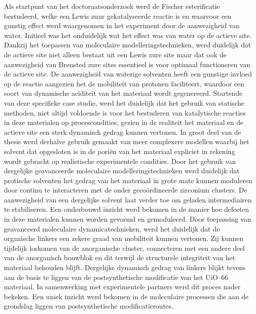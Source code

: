 \npar
Als startpunt van het doctoraatsonderzoek werd de Fischer esterificatie bestudeerd, welke een Lewis zuur gekatalyseerde reactie is en waarvoor een gunstig effect werd waargenomen in het experiment door de aanwezigheid van water. Initieel was het onduidelijk wat het effect was van water op de actieve site. Dankzij het toepassen van moleculaire modelleringstechnieken, werd duidelijk dat de actieve site niet alleen bestaat uit een Lewis zure site maar dat ook de aanwezigheid van Brønsted zure sites essentieel is voor optimaal functioneren van de actieve site. De aanwezigheid van waterige solventen heeft een gunstige invloed op de reactie aangezien het de mobiliteit van protonen faciliteert, waardoor een soort van dynamische aciditeit van het materiaal wordt gegenereerd. 
\npar
Startende van deze specifieke case studie, werd het duidelijk dat het gebruik van statische methoden, niet altijd voldoende is voor het bestuderen van katalytische reacties in deze materialen op procescondities, gezien in de realiteit het materiaal en de actieve site een sterk dynamisch gedrag kunnen vertonen. In groot deel van de thesis werd derhalve gebruik gemaakt van meer complexere modellen waarbij het solvent dat opgesloten is in de poriën van het materiaal expliciet in rekening wordt gebracht op realistische experimentele condities. Door het gebruik van dergelijke geavanceerde moleculaire modelleringstechnieken werd duidelijk dat protische solventen het gedrag van het materiaal in grote mate kunnen moduleren door continu te interacteren met de onder gecoördineerde zirconium clusters. De aanwezigheid van een dergelijke solvent laat verder toe om geladen intermediairen te stabiliseren. Een onderbouwd inzicht werd bekomen in de manier hoe defecten in deze materialen kunnen worden gevormd en gemoduleerd. Door toepassing van geavanceerd moleculaire dynamicatechnieken, werd het duidelijk dat de organische linkers een zekere graad van mobiliteit kunnen vertonen. Zij kunnen tijdelijk loskomen van de anorganische cluster, connecteren met een andere deel van de anorganisch bouwblok en dit terwijl de structurele integriteit van het materiaal behouden blijft. Dergelijke dynamisch gedrag van linkers blijkt tevens aan de basis te liggen van de postsynthetische modificatie van het UiO--66 materiaal. In samenwerking met experimentele partners werd dit proces nader bekeken. Een uniek inzicht werd bekomen in de moleculaire processen die aan de grondslag liggen van postsynthetische modificatieroutes. 
\npar
